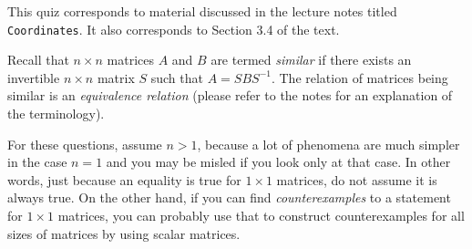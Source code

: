 \documentclass[10pt]{amsart}
\begin{document}
This quiz corresponds to material discussed in the lecture notes
titled {\tt Coordinates}. It also corresponds to Section 3.4 of the
text.

Recall that $n \times n$ matrices $A$ and $B$ are termed {\em similar}
if there exists an invertible $n \times n$ matrix $S$ such that $A =
SBS^{-1}$. The relation of matrices being similar is an {\em
  equivalence relation} (please refer to the notes for an explanation
of the terminology).

For these questions, assume $n > 1$, because a lot of phenomena are
much simpler in the case $n = 1$ and you may be misled if you look
only at that case. In other words, just because an equality is true
for $1 \times 1$ matrices, do not assume it is always true. On the
other hand, if you can find {\em counterexamples} to a statement for
$1 \times 1$ matrices, you can probably use that to construct
counterexamples for all sizes of matrices by using scalar matrices.
\end{document}
